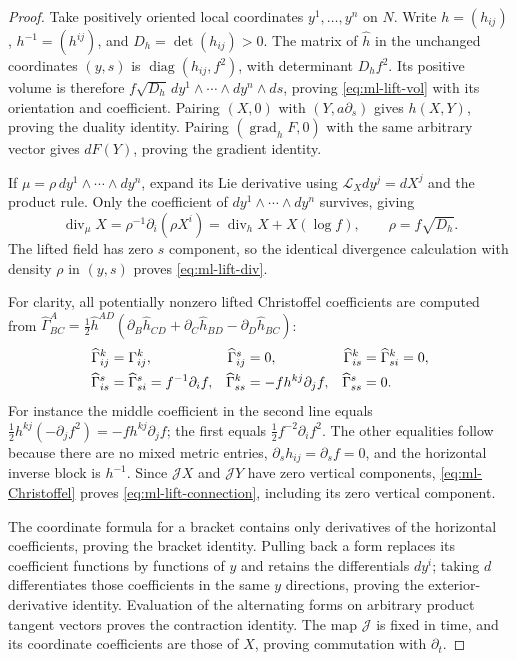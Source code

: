\begin{proof}
Take positively oriented local coordinates $y^1,\ldots,y^n$ on $N$.
Write $h=(h_{ij})$, $h^{-1}=(h^{ij})$, and $D_h=\det(h_{ij})>0$.
The matrix of $\widehat h$ in the unchanged coordinates $(y,s)$ is
$\operatorname{diag}(h_{ij},f^2)$, with determinant $D_hf^2$.
Its positive volume is therefore
$f\sqrt{D_h}\,dy^1\wedge\cdots\wedge dy^n\wedge ds$, proving
\eqref{eq:ml-lift-vol} with its orientation and coefficient.
Pairing $(X,0)$ with $(Y,a\partial_s)$ gives $h(X,Y)$, proving the
duality identity. Pairing $(\operatorname{grad}_hF,0)$ with the same
arbitrary vector gives $dF(Y)$, proving the gradient identity.

If $\mu=\rho\,dy^1\wedge\cdots\wedge dy^n$, expand its Lie derivative
using $\mathcal L_X dy^j=dX^j$ and the product rule. Only the coefficient
of $dy^1\wedge\cdots\wedge dy^n$ survives, giving
\begin{equation}\label{eq:ml-div-coord}
 \operatorname{div}_\mu X
     =\rho^{-1}\partial_i(\rho X^i)
     =\operatorname{div}_hX+X(\log f),
 \qquad\rho=f\sqrt{D_h}.
\end{equation}
The lifted field has zero $s$ component, so the identical divergence
calculation with density $\rho$ in $(y,s)$ proves
\eqref{eq:ml-lift-div}.

For clarity, all potentially nonzero lifted Christoffel coefficients are
computed from
$\widehat\Gamma^A_{BC}=\tfrac12\widehat h^{AD}
(\partial_B\widehat h_{CD}+\partial_C\widehat h_{BD}
-\partial_D\widehat h_{BC})$:
\begin{align}
 \widehat\Gamma^k_{ij}&=\Gamma^k_{ij},&
 \widehat\Gamma^s_{ij}&=0,&
 \widehat\Gamma^k_{is}&=\widehat\Gamma^k_{si}=0,\notag\\
 \widehat\Gamma^s_{is}&=\widehat\Gamma^s_{si}=f^{-1}\partial_i f,&
 \widehat\Gamma^k_{ss}&=-f h^{kj}\partial_jf,&
 \widehat\Gamma^s_{ss}&=0.                            \label{eq:ml-Christoffel}
\end{align}
For instance the middle coefficient in the second line equals
$\tfrac12h^{kj}(-\partial_j f^2)=-f h^{kj}\partial_jf$;
the first equals $\tfrac12 f^{-2}\partial_i f^2$.
The other equalities follow because there are no mixed metric entries,
$\partial_s h_{ij}=\partial_s f=0$, and the horizontal inverse block
is $h^{-1}$. Since $\mathcal JX$ and $\mathcal JY$ have zero vertical
components, \eqref{eq:ml-Christoffel} proves
\eqref{eq:ml-lift-connection}, including its zero vertical component.

The coordinate formula for a bracket contains only derivatives of the
horizontal coefficients, proving the bracket identity. Pulling back a
form replaces its coefficient functions by functions of $y$ and retains
the differentials $dy^i$; taking $d$ differentiates those coefficients
in the same $y$ directions, proving the exterior-derivative identity.
Evaluation of the alternating forms on arbitrary product tangent vectors
proves the contraction identity. The map $\mathcal J$ is fixed in time,
and its coordinate coefficients are those of $X$, proving commutation
with $\partial_t$.
\end{proof}

